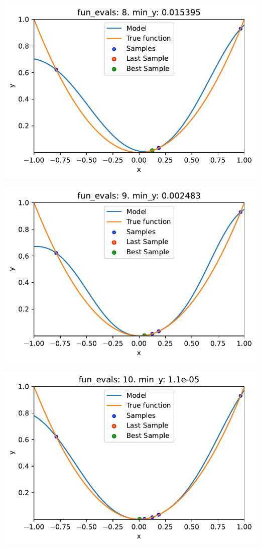 \documentclass[
  letterpaper,
  DIV=11,
  numbers=noendperiod]{scrreprt}
\begin{document}
\includegraphics{010_num_spot_sklearn_surrogate_files/figure-pdf/cell-20-output-7.pdf}

\includegraphics{010_num_spot_sklearn_surrogate_files/figure-pdf/cell-20-output-8.pdf}

\includegraphics{010_num_spot_sklearn_surrogate_files/figure-pdf/cell-20-output-9.pdf}
\end{document}
